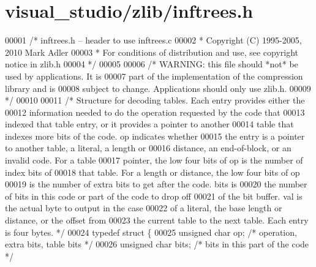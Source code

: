 \hypertarget{visual__studio_2zlib_2inftrees_8h_source}{}\section{visual\+\_\+studio/zlib/inftrees.h}
\label{visual__studio_2zlib_2inftrees_8h_source}

\begin{DoxyCode}
00001 \textcolor{comment}{/* inftrees.h -- header to use inftrees.c}
00002 \textcolor{comment}{ * Copyright (C) 1995-2005, 2010 Mark Adler}
00003 \textcolor{comment}{ * For conditions of distribution and use, see copyright notice in zlib.h}
00004 \textcolor{comment}{ */}
00005 
00006 \textcolor{comment}{/* WARNING: this file should *not* be used by applications. It is}
00007 \textcolor{comment}{   part of the implementation of the compression library and is}
00008 \textcolor{comment}{   subject to change. Applications should only use zlib.h.}
00009 \textcolor{comment}{ */}
00010 
00011 \textcolor{comment}{/* Structure for decoding tables.  Each entry provides either the}
00012 \textcolor{comment}{   information needed to do the operation requested by the code that}
00013 \textcolor{comment}{   indexed that table entry, or it provides a pointer to another}
00014 \textcolor{comment}{   table that indexes more bits of the code.  op indicates whether}
00015 \textcolor{comment}{   the entry is a pointer to another table, a literal, a length or}
00016 \textcolor{comment}{   distance, an end-of-block, or an invalid code.  For a table}
00017 \textcolor{comment}{   pointer, the low four bits of op is the number of index bits of}
00018 \textcolor{comment}{   that table.  For a length or distance, the low four bits of op}
00019 \textcolor{comment}{   is the number of extra bits to get after the code.  bits is}
00020 \textcolor{comment}{   the number of bits in this code or part of the code to drop off}
00021 \textcolor{comment}{   of the bit buffer.  val is the actual byte to output in the case}
00022 \textcolor{comment}{   of a literal, the base length or distance, or the offset from}
00023 \textcolor{comment}{   the current table to the next table.  Each entry is four bytes. */}
00024 \textcolor{keyword}{typedef} \textcolor{keyword}{struct }\{
00025     \textcolor{keywordtype}{unsigned} \textcolor{keywordtype}{char} op;           \textcolor{comment}{/* operation, extra bits, table bits */}
00026     \textcolor{keywordtype}{unsigned} \textcolor{keywordtype}{char} bits;         \textcolor{comment}{/* bits in this part of the code */}

\end{DoxyCode}
